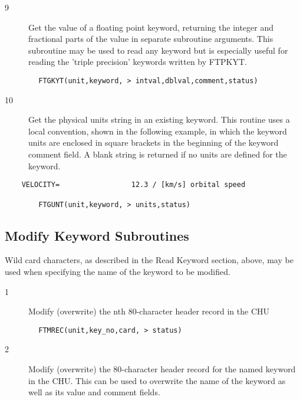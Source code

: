 \documentclass[11pt]{book}
\begin{document}
\begin{description}
\item[9 ] Get the value of a floating point keyword, returning the integer and
    fractional parts of the value in separate subroutine arguments.
    This subroutine may be used to read any keyword but is especially
   useful for reading the 'triple precision' keywords written by FTPKYT.
\end{description}

\begin{verbatim}
        FTGKYT(unit,keyword, > intval,dblval,comment,status)
\end{verbatim}

\begin{description}
\item[10]  Get the physical units string in an existing keyword.  This
    routine uses a local convention, shown in the following example,
    in which the keyword units are
    enclosed in square brackets in the beginning of the keyword comment
    field.  A blank string is returned if no units are defined
    for the keyword.
\end{description}

\begin{verbatim}
    VELOCITY=                 12.3 / [km/s] orbital speed

        FTGUNT(unit,keyword, > units,status)
\end{verbatim}

\subsection{Modify Keyword Subroutines \label{FTMREC}}

Wild card characters, as described in the Read Keyword section, above,
may be used when specifying the name of the keyword to be modified.


\begin{description}
\item[1 ] Modify (overwrite) the nth 80-character header record in the CHU
\end{description}

\begin{verbatim}
        FTMREC(unit,key_no,card, > status)
\end{verbatim}

\begin{description}
\item[2 ] Modify (overwrite) the 80-character header record for the named keyword
    in the CHU.  This can be used to overwrite the name of the keyword as
   well as its value and comment fields.
\end{description}
\end{document}
